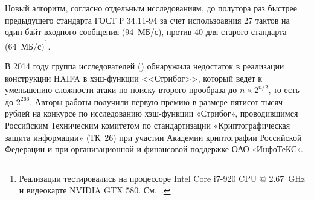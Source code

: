 Новый алгоритм, согласно отдельным исследованиям, до полутора раз быстрее предыдущего стандарта ГОСТ Р 34.11-94 за счет использоавния 27 тактов на один байт входного сообщения (94~МБ/с), против 40 для старого стандарта (64~МБ/с)\footnote{Реализации тестировались на процессоре Intel Core i7-920 CPU @ 2.67~GHz и видеокарте NVIDIA GTX 580. См.~\cite{Lebedev:2013}.}.

В 2014 году группа исследователей (\cite{Guo:Jean:Leurent:Peyrin:Wang:2014}) обнаружила недостаток в реализации конструкции HAIFA в хэш-функции <<Стрибог>>, который ведёт к уменьшению сложности атаки по поиску второго прообраза до $n \times 2^{n/2}$, то есть до $2^{266}$. Авторы работы получили первую премию в размере пятисот тысяч рублей на конкурсе по исследованию хэш-функции «Стрибог», проводившимся Российским Техническим комитетом по стандартизации «Криптографическая защита информации» (ТК~26) при участии Академии криптографии Российской Федерации и при организационной и финансовой поддержке ОАО «ИнфоТеКС».

